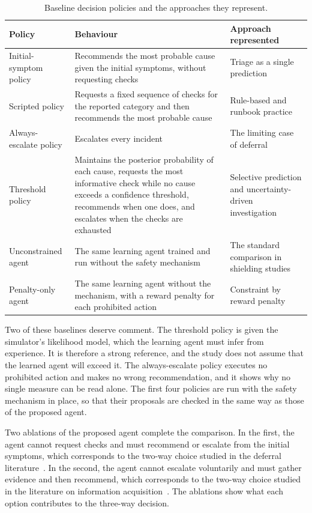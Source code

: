 \documentclass[12pt,a4paper]{article}
\begin{document}
\begin{table}[htbp]
\centering
\caption{Baseline decision policies and the approaches they represent.}
\label{tab:baselines}
\small
\begin{tabularx}{\textwidth}{@{}p{}LL@{}}
\toprule
Policy & Behaviour & Approach represented \\
\midrule
Initial-symptom policy & Recommends the most probable cause given the initial symptoms, without requesting checks & Triage as a single prediction~\cite{chen2020,remil2024} \\
Scripted policy & Requests a fixed sequence of checks for the reported category and then recommends the most probable cause & Rule-based and runbook practice~\cite{remil2024,dantonio2025} \\
Always-escalate policy & Escalates every incident & The limiting case of deferral \\
Threshold policy & Maintains the posterior probability of each cause, requests the most informative check while no cause exceeds a confidence threshold, recommends when one does, and escalates when the checks are exhausted & Selective prediction and uncertainty-driven investigation~\cite{geifman2019,kim2025} \\
Unconstrained agent & The same learning agent trained and run without the safety mechanism & The standard comparison in shielding studies~\cite{alshiekh2018,jansen2020} \\
Penalty-only agent & The same learning agent without the mechanism, with a reward penalty for each prohibited action & Constraint by reward penalty~\cite{konighofer2025} \\
\bottomrule
\end{tabularx}
\end{table}

Two of these baselines deserve comment. The threshold policy is given the simulator's likelihood model, which the learning agent must infer from experience. It is therefore a strong reference, and the study does not assume that the learned agent will exceed it. The always-escalate policy executes no prohibited action and makes no wrong recommendation, and it shows why no single measure can be read alone. The first four policies are run with the safety mechanism in place, so that their proposals are checked in the same way as those of the proposed agent.

Two ablations of the proposed agent complete the comparison. In the first, the agent cannot request checks and must recommend or escalate from the initial symptoms, which corresponds to the two-way choice studied in the deferral literature~\cite{madras2018}. In the second, the agent cannot escalate voluntarily and must gather evidence and then recommend, which corresponds to the two-way choice studied in the literature on information acquisition~\cite{janisch2019}. The ablations show what each option contributes to the three-way decision.
\end{document}
